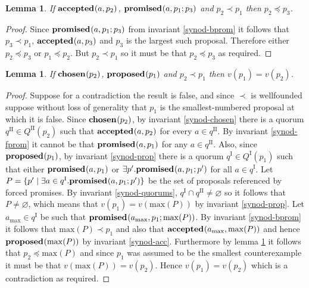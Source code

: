 \documentclass[journal]{IEEEtran}
\newtheorem{lemma}[theorem]{Lemma}
\begin{document}
\begin{lemma}\label{synod-acc-bprom}If $\mathbf{accepted}_{}(a,p_2)$, $\mathbf{promised}_{}(a,p_1;p_3)$
and $p_2 \prec p_1$ then $p_2 \preceq p_3$.\end{lemma}

\begin{proof}Since $\mathbf{promised}_{}(a,p_1;p_3)$ from invariant \ref{synod-bprom} it
follows that $p_3 \prec p_1$, $\mathbf{accepted}_{}(a,p_3)$ and $p_3$ is the largest such
proposal. Therefore either $p_2 \preceq p_3$ or $p_1 \preceq p_2$.  But $p_2
\prec p_1$ so it must be that $p_2 \preceq p_3$ as required.  \end{proof}

\begin{lemma}\label{synod-lemma} If $\mathbf{chosen}_{}(p_2)$, $\mathbf{proposed}_{}(p_1)$ and $p_2 \prec
p_1$ then $v(p_1) = v(p_2)$. \end{lemma}

\begin{proof}Suppose for a contradiction the result is false, and since $\prec$
is wellfounded suppose without loss of generality that $p_1$ is the
smallest-numbered proposal at which it is false.  Since $\mathbf{chosen}_{}(p_2)$, by
invariant \ref{synod-chosen} there is a quorum $q^\textrm{II} \in
Q^\textrm{II}(p_2)$ such that $\mathbf{accepted}_{}(a,p_2)$ for every $a \in q^\textrm{II}$.
By invariant \ref{synod-fprom} it cannot be that $\mathbf{promised}_{}(a,p_1)$ for any $a
\in q^\textrm{II}$.  Also, since $\mathbf{proposed}_{}(p_1)$, by invariant \ref{synod-prop}
there is a quorum $q^\textrm{I} \in Q^\textrm{I}(p_1)$ such that either
$\mathbf{promised}_{}(a,p_1)$ or $\exists p'.  \mathbf{promised}_{}(a,p_1;p')$ for all $a \in
q^\textrm{I}$.  Let $P = \{ p' \mid \exists a \in q^\textrm{I}.
\mathbf{promised}_{}(a,p_1;p') \}$ be the set of proposals referenced by forced promises.
By invariant \ref{synod-quorums}, $q^\textrm{I} \cap q^\textrm{II} \ne
\varnothing$ so it follows that $P \ne \varnothing$, which means that $v(p_1) =
v(\mathrm{max}(P))$ by invariant \ref{synod-prop}. Let $a_{\mathrm{max}} \in
q^\textrm{I}$ be such that $\mathbf{promised}_{}(a_{\mathrm{max}},p_1;\mathrm{max}(P))$.
By invariant \ref{synod-bprom} it follows that $\mathrm{max}(P) \prec p_1$ and
also that $\mathbf{accepted}_{}(a_{\mathrm{max}},\mathrm{max}(P))$ and hence
$\mathbf{proposed}_{}(\mathrm{max}(P))$ by invariant \ref{synod-acc}. Furthermore by lemma
\ref{synod-acc-bprom} it follows that $p_2 \preceq \mathrm{max}(P)$ and since
$p_1$ was assumed to be the smallest counterexample it must be that
$v(\mathrm{max}(P)) = v(p_2)$.  Hence $v(p_1) = v(p_2)$ which is a
contradiction as required.  \end{proof}
\end{document}
